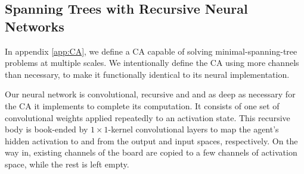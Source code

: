 \documentclass{article}
\begin{document}
\subsection{Spanning Trees with Recursive Neural Networks}

In appendix \ref{app:CA}, we define a CA capable of solving minimal-spanning-tree problems at multiple scales. 
We intentionally define the CA using more channels than necessary, to make it functionally identical to its neural implementation.

Our neural network is convolutional, recursive and and as deep as necessary for the CA it implements to complete its computation. 
It consists of one set of convolutional weights applied repeatedly to an activation state.
This recursive body is book-ended by $1\times 1$-kernel convolutional layers to map the agent's hidden activation to and from the output and input spaces, respectively.
On the way in, existing channels of the board are copied to a few channels of activation space, while the rest is left empty.


\end{document}

